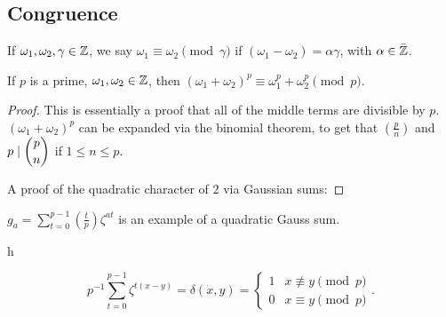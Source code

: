 \documentclass{article}
\begin{document}
\subsection{Congruence} 
If $\omega_1, \omega_2, \gamma \in \mathbb Z$, we say $\omega_1 \equiv \omega_2 \pmod \gamma$ if $(\omega_1 - \omega_2) = \alpha \gamma$, with $\alpha \in \bar{\mathbb Z}$.

\begin{lemma}
	If $p$ is a prime, $\omega_1, \omega_2 \in \mathbb Z$, then $(\omega_1 + \omega_2)^p \equiv \omega_1^p + \omega_2^p \pmod p$.
\end{lemma}

\begin{proof}
	This is essentially a proof that all of the middle terms are divisible by $p$.
	$(\omega_1 + \omega_2)^p$ can be expanded via the binomial theorem, to get 
	that $\left( \frac{p}{n} \right)$ and $p \mid \dbinom{p}{n}$ if $1 \leq n \leq p$.

	A proof of the quadratic character of $2$ via Gaussian sums:
\end{proof}

\begin{definition}
	$g_a = \sum_{t = 0}^{p-1} \left(\frac{t}{p}\right) \zeta^{at}$ is an example of a quadratic Gauss sum.
\end{definition}

\begin{lemma}
	h
\end{lemma}

\begin{corollary}
	\[p^{-1} \sum_{t = 0}^{p - 1} \zeta^{t(x - y)} = \delta(x, y) = \begin{cases} 1 & x \not \equiv y \pmod p \\ 0 & x \equiv y \pmod p \end{cases}.\] 
\end{corollary} 
\end{document}
